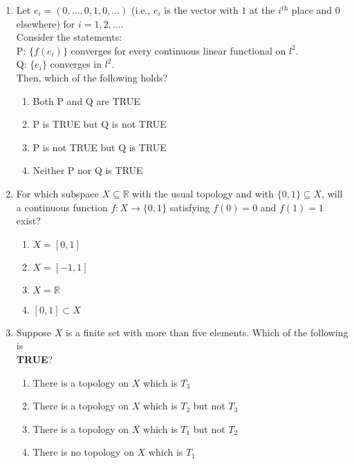 \documentclass[journal]{IEEEtran}
\numberwithin{equation}{enumi}
\numberwithin{figure}{enumi}
\begin{document}
\begin{enumerate}
    \item Let $e_i = (0, \ldots, 0, 1, 0, \ldots)$ (i.e., $e_i$ is the vector with $1$ at the $i^\text{th}$ place and $0$ elsewhere) for $i = 1, 2, \ldots$. \\
    Consider the statements: \\
    P: $\{f(e_i)\}$ converges for every continuous linear functional on $l^2$. \\
    Q: $\{e_i\}$ converges in $l^2$. \\
    Then, which of the following holds?
\hfill{}
\begin{multicols}{2}
\begin{enumerate}
\item  Both P and Q are TRUE
\item  P is TRUE but Q is not TRUE
\item  P is not TRUE but Q is TRUE
\item  Neither P nor Q is TRUE
\end{enumerate}
\end{multicols}
    

    
\item For which subspace $X \subseteq \mathbb{R}$ with the usual topology and with $\{0,1\} \subseteq X$, will a continuous function $f : X \to \{0, 1\}$ satisfying $f(0) = 0$ and $f(1) = 1$ exist?
 \hfill{}
\begin{multicols}{2}
\begin{enumerate}
\item  $X = [0,1]$
\item $X = [-1,1]$
\item $X = \mathbb{R}$
\item $[0,1] \subset X$
\end{enumerate}
\end{multicols}



 \item Suppose $X$ is a finite set with more than five elements. Which of the following is\\ \textbf{TRUE}?   \hfill{}

\begin{enumerate}
    \item There is a topology on $X$ which is $T_3$
    \item There is a topology on $X$ which is $T_2$ but not $T_3$
    \item There is a topology on $X$ which is $T_1$ but not $T_2$
    \item There is no topology on $X$ which is $T_1$
\end{enumerate}


\end{enumerate}
\end{document}
